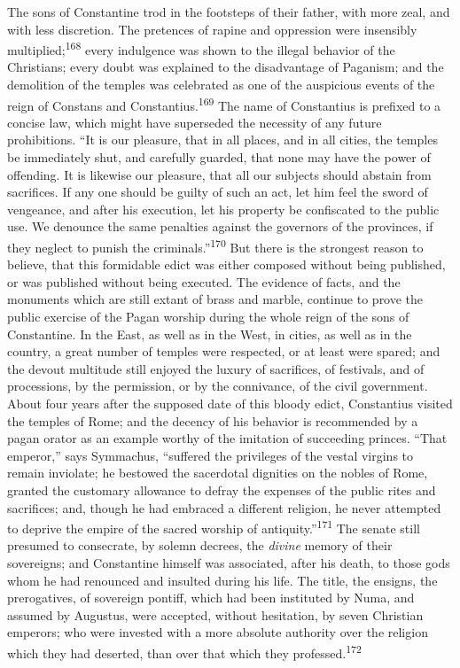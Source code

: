 The sons of Constantine trod in the footsteps of their father,
with more zeal, and with less discretion. The pretences of rapine
and oppression were insensibly multiplied;\textsuperscript{168} every indulgence
was shown to the illegal behavior of the Christians; every doubt
was explained to the disadvantage of Paganism; and the demolition
of the temples was celebrated as one of the auspicious events of
the reign of Constans and Constantius.\textsuperscript{169} The name of
Constantius is prefixed to a concise law, which might have
superseded the necessity of any future prohibitions. “It is our
pleasure, that in all places, and in all cities, the temples be
immediately shut, and carefully guarded, that none may have the
power of offending. It is likewise our pleasure, that all our
subjects should abstain from sacrifices. If any one should be
guilty of such an act, let him feel the sword of vengeance, and
after his execution, let his property be confiscated to the
public use. We denounce the same penalties against the governors
of the provinces, if they neglect to punish the criminals.”\textsuperscript{170}
But there is the strongest reason to believe, that this
formidable edict was either composed without being published, or
was published without being executed. The evidence of facts, and
the monuments which are still extant of brass and marble,
continue to prove the public exercise of the Pagan worship during
the whole reign of the sons of Constantine. In the East, as well
as in the West, in cities, as well as in the country, a great
number of temples were respected, or at least were spared; and
the devout multitude still enjoyed the luxury of sacrifices, of
festivals, and of processions, by the permission, or by the
connivance, of the civil government. About four years after the
supposed date of this bloody edict, Constantius visited the
temples of Rome; and the decency of his behavior is recommended
by a pagan orator as an example worthy of the imitation of
succeeding princes. “That emperor,” says Symmachus, “suffered the
privileges of the vestal virgins to remain inviolate; he bestowed
the sacerdotal dignities on the nobles of Rome, granted the
customary allowance to defray the expenses of the public rites
and sacrifices; and, though he had embraced a different religion,
he never attempted to deprive the empire of the sacred worship of
antiquity.”\textsuperscript{171} The senate still presumed to consecrate, by
solemn decrees, the \textit{divine} memory of their sovereigns; and
Constantine himself was associated, after his death, to those
gods whom he had renounced and insulted during his life. The
title, the ensigns, the prerogatives, of sovereign pontiff, which
had been instituted by Numa, and assumed by Augustus, were
accepted, without hesitation, by seven Christian emperors; who
were invested with a more absolute authority over the religion
which they had deserted, than over that which they professed.\textsuperscript{172}

